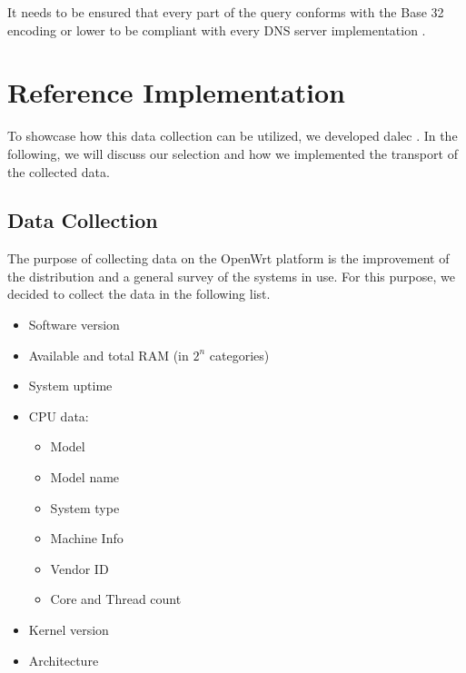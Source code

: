         It needs to be ensured that every part of the query conforms with the Base 32 encoding or lower to be compliant with every DNS server implementation \cite{mockapetris_domain_1987}.

\newpage


\section{Reference Implementation}
\label{sec:software_design:ref_impl}
    To showcase how this data collection can be utilized, we developed dalec \cite{venz_ikstreamdalec_2021}.
    In the following, we will discuss our selection and how we implemented the transport of the collected data.
%
\subsection{Data Collection}
    The purpose of collecting data on the OpenWrt platform is the improvement of the distribution and a general survey of the systems in use. For this purpose, we decided to collect the data in the following list. 
    \begin{itemize}
        \item Software version
        \item Available and total RAM (in $2^n$ categories)
        \item System uptime
        \item CPU data:
        \begin{itemize}
            \item Model
            \item Model name
            \item System type
            \item Machine Info
            \item Vendor ID
            \item Core and Thread count
        \end{itemize}
        \item Kernel version
        \item Architecture
    \end{itemize}
    
